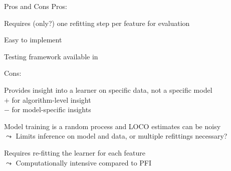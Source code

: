 \documentclass[10pt,compress,t,notes=noshow, xcolor=table]{beamer}
\begin{document}
\begin{framev}[align=top]{Pros and Cons}
Pros:
\begin{itemizeM}
\item Requires (only?) one refitting step per feature for evaluation
\item Easy to implement
\item Testing framework available in 
\end{itemizeM}
%
Cons:
\begin{itemizeM}
\item Provides insight into a learner on specific data, not a specific model\\
$+$ for algorithm-level insight\\
$-$ for model-specific insights
\item Model training is a random process and LOCO estimates can be noisy\\
$\leadsto$ Limits inference on model and data, or multiple refittings necessary?
\item Requires re-fitting the learner for each feature\\
$\leadsto$ Computationally intensive compared to PFI
\end{itemizeM}
\end{framev}


\endlecture
\end{document}
